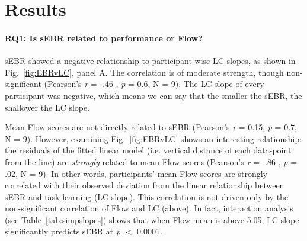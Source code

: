 \documentclass[10pt,letterpaper,floatsintext]{article}
\begin{document}
\section{Results}

\paragraph{RQ1: Is sEBR related to performance or Flow?}

sEBR showed a negative relationship to participant-wise LC slopes, as shown in Fig.~\ref{fig:EBRvLC}, panel A. The correlation is of moderate strength, though non-significant (Pearson's {\it r} = -.46 , {\it p} = 0.6, N = 9). %
The LC slope of every participant was negative, which means we can say that the smaller the sEBR, the shallower the LC slope.%


Mean Flow scores are not directly related to sEBR (Pearson's {\it r} = 0.15, {\it p} = 0.7, N = 9). %
However, examining Fig.~\ref{fig:EBRvLC} shows an interesting relationship: the residuals of the fitted linear model (i.e. vertical distance of each data-point from the line) are {\it strongly} related to mean Flow scores (Pearson's {\it r} = -.86 , {\it p} = .02, N = 9). %
In other words, participants' mean Flow scores are strongly correlated with their observed deviation from the linear relationship between sEBR and task learning (LC slope). This correlation is not driven only by the non-significant correlation of Flow and LC (above). In fact, interaction analysis (see Table~\ref{tab:simpslopes}) shows that when Flow mean is above 5.05, LC slope significantly predicts sEBR at {\it p} $<$ 0.0001. %
\end{document}
